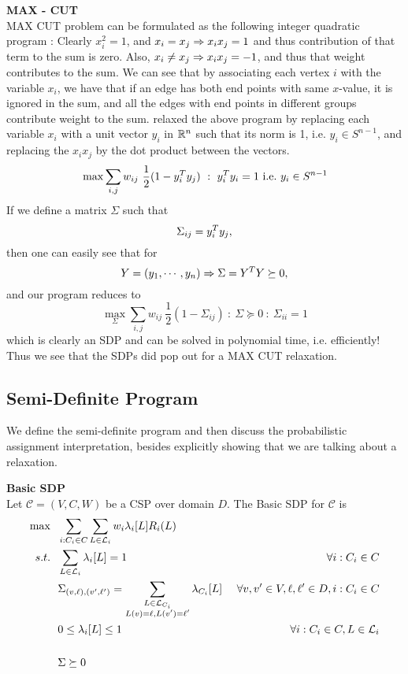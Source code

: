 \begin{example}{\bf MAX - CUT}\label{maxcut}\\
MAX CUT problem can be formulated as the following integer quadratic program : 
Clearly $x_i^2=1$, and $x_i=x_j\Rightarrow x_ix_j=1$ and thus contribution of that term to the sum is zero. 
Also, $x_i \neq x_j \Rightarrow x_ix_j=-1$, and thus that weight contributes to the sum. 
We can see that by associating each vertex $i$ with the variable $x_i$, we have that if an edge has both end points with same $x$-value, it is ignored in the sum, and all the edges with end points in different groups contribute weight to the sum. 
\cite{delormecombinatorial} relaxed the above program by replacing each variable $x_i$ with a unit vector $y_i$ in $\mathbb{R}^n$ such that its norm is 1, i.e. $y_i \in S^{n-1}$, and replacing the $x_ix_j$ by the dot product between the vectors. 
\[ \max \sum_{i,j} w_{ij} \ \frac{1}{2}(1-y_i^T y_j) ~:~ y_i^T y_i = 1 {\mbox {\ i.e.\ }} y_i \in S^{n-1} \]
If we define a matrix $\Sigma$ such that $$\Sigma_{ij} = y_i^T y_j,$$ then one can easily see that for $$Y = (y_1, \cdots, y_n) \Rightarrow \Sigma = Y^T Y \succeq 0,$$ and our program reduces to 
\[ \max_\Sigma \sum_{i,j} w_{ij} \ \frac{1}{2}(1-\Sigma_{ij}) ~:~ \Sigma \succeq 0 ~:~ \Sigma_{ii} = 1  \]
which is clearly an SDP and can be solved in polynomial time, i.e. efficiently! 
Thus we see that the SDPs did pop out for a MAX CUT relaxation.
\end{example}

\subsection{Semi-Definite Program}
We define the semi-definite program and then discuss the probabilistic assignment interpretation, besides explicitly showing that we are talking about a relaxation.

\begin{definition}\textbf{Basic SDP} \\
Let $\mathcal{C} = (V,C,W)$ be a CSP over domain $D$. The Basic SDP for $\mathcal{C}$ is
\begin{alignat}{2}
\max ~&~ \sum_{i : C_i \in C} \sum_{L \in \mathcal{L}_i}   w_i\lambda_i[L] R_i(L) & \\
s.t. ~ & ~ \sum_{L \in \mathcal{L}_i} \lambda_i[L] = 1  & \forall i : C_i \in C \label{eq:SDPlambdaSum} \\
     ~ & ~ \Sigma_{\left(v, \ell\right),\left(v', \ell'\right)} = \sum_{\substack {L\in \mathcal{L}_{C_i}\\ L(v) = \ell, L(v')=\ell'} }\lambda_{C_i}[L] &~\forall v,v' \in V, \ell,\ell' \in D, i : C_i \in C \label{eq:SDPtiePSD}\\
     ~ & ~ 0 \leq \lambda_i[L] \leq 1  & \forall  i : C_i \in C, L \in \mathcal{L}_i  \label{eq:SDPlambdaNonNeg} \\ 
     ~& ~ \\
     ~ & ~ \Sigma \succeq 0& \label{eq:SDPPSD}
\end{alignat}
\end{definition}

